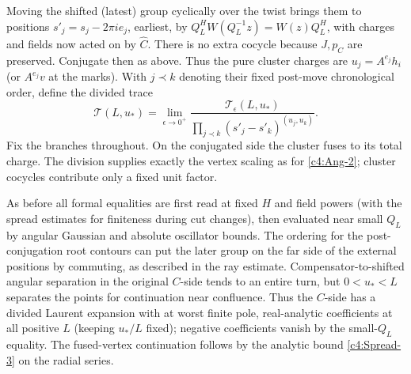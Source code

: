Moving the shifted (latest) group cyclically over the twist brings them to positions \(s'_j=s_j-2\pi i e_j\), earliest, by \(Q_L^H W(Q_L^{-1}z)=W(z)Q_L^H\), with charges and fields now acted on by \(\widehat C\). There is no extra cocycle because \(J,p_C\) are preserved. Conjugate then as above. Thus the pure cluster charges are \(u_j=A^{e_j}h_i\) (or \(A^{e_j}v\) at the marks). With \(j\prec k\) denoting their fixed post-move chronological order, define the divided trace
\begin{equation}\label{c4:confluent-trace}
 \mathcal T(L,u_*)=
 \lim_{\epsilon\to0^+}
 \frac{\mathcal T_\epsilon(L,u_*)}
      {\prod_{j\prec k}(s'_j-s'_k)^{(u_j,u_k)}}.
\end{equation}
Fix the branches throughout. On the conjugated side the cluster fuses
to its total charge. The division supplies exactly the vertex scaling
as for \eqref{c4:Ang-2}; cluster cocycles contribute only a fixed unit
factor.

As before all formal equalities are first read at fixed \(H\) and field powers (with the spread estimates for finiteness during cut changes), then evaluated near small \(Q_L\) by angular Gaussian and absolute oscillator bounds. The ordering for the post-conjugation root contours can put the later group on the far side of the external positions by commuting, as described in the ray estimate. Compensator-to-shifted angular separation in the original \(C\)-side tends to an entire turn, but \(0<u_*<L\) separates the points for continuation near confluence. Thus the \(C\)-side has a divided Laurent expansion with at worst finite pole, real-analytic coefficients at all positive \(L\) (keeping \(u_*/L\) fixed); negative coefficients vanish by the small-\(Q_L\) equality. The fused-vertex continuation follows by the analytic bound \eqref{c4:Spread-3} on the radial series.

